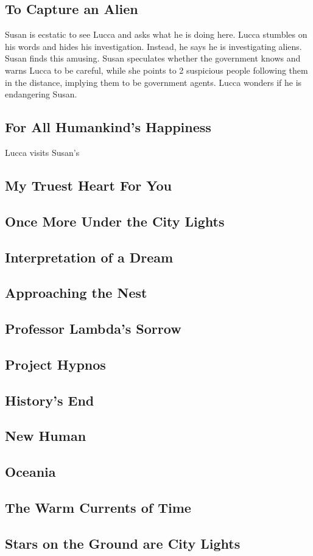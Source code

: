 \documentclass[11pt]{article}
\begin{document}
	\subsection{To Capture an Alien}
	Susan is ecstatic to see Lucca and asks what he is doing here. Lucca stumbles on his words and hides his investigation. Instead, he says he is investigating aliens. Susan finds this amusing. Susan speculates whether the government knows and warns Lucca to be careful, while she points to 2 suspicious people following them in the distance, implying them to be government agents. Lucca wonders if he is endangering Susan. 
	\subsection{For All Humankind's Happiness}
	Lucca visits Susan's 
	\subsection{My Truest Heart For You}
	
	\subsection{Once More Under the City Lights}
	
	\subsection{Interpretation of a Dream}
	
	\subsection{Approaching the Nest}
	
	\subsection{Professor Lambda's Sorrow}
	
	\subsection{Project Hypnos}
	
	\subsection{History's End}
	
	\subsection{New Human}
	
	\subsection{Oceania}
	
	\subsection{The Warm Currents of Time}
	
	\subsection{Stars on the Ground are City Lights}
	
	
\end{document}
